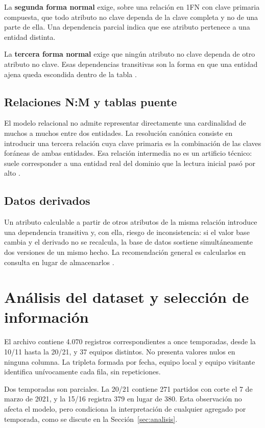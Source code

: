 \documentclass[conference]{IEEEtran}
\begin{document}
La \textbf{segunda forma normal} exige, sobre una relación en 1FN con clave
primaria compuesta, que todo atributo no clave dependa de la clave completa y
no de una parte de ella. Una dependencia parcial indica que ese atributo
pertenece a una entidad distinta.

La \textbf{tercera forma normal} exige que ningún atributo no clave dependa de
otro atributo no clave. Esas dependencias transitivas son la forma en que una
entidad ajena queda escondida dentro de la tabla \cite{elmasri}.

\subsection{Relaciones N:M y tablas puente}

El modelo relacional no admite representar directamente una cardinalidad de
muchos a muchos entre dos entidades. La resolución canónica consiste en
introducir una tercera relación cuya clave primaria es la combinación de las
claves foráneas de ambas entidades. Esa relación intermedia no es un artificio
técnico: suele corresponder a una entidad real del dominio que la lectura
inicial pasó por alto \cite{connolly}.

\subsection{Datos derivados}

Un atributo calculable a partir de otros atributos de la misma relación
introduce una dependencia transitiva y, con ella, riesgo de inconsistencia: si
el valor base cambia y el derivado no se recalcula, la base de datos sostiene
simultáneamente dos versiones de un mismo hecho. La recomendación general es
calcularlos en consulta en lugar de almacenarlos \cite{date}.

\section{Análisis del dataset y selección de información}

El archivo contiene 4.070 registros correspondientes a once temporadas, desde
la 10/11 hasta la 20/21, y 37 equipos distintos. No presenta valores nulos en
ninguna columna. La tripleta formada por fecha, equipo local y equipo visitante
identifica unívocamente cada fila, sin repeticiones.

Dos temporadas son parciales. La 20/21 contiene 271 partidos con corte el 7 de
marzo de 2021, y la 15/16 registra 379 en lugar de 380. Esta observación no
afecta el modelo, pero condiciona la interpretación de cualquier agregado por
temporada, como se discute en la Sección~\ref{sec:analisis}.
\end{document}
